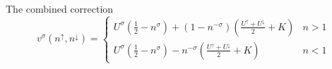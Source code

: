 \documentclass[xcolor=table,aspectratio=169]{beamer}
\numberwithin{equation}{section}
\begin{document}
\begin{frame}{The combined correction}
    \begin{equation}
        v^\sigma(n^\uparrow, n^\downarrow) =
        \begin{cases}
            {U^\sigma}
            \left(\frac{1}{2} - n^\sigma\right)
            +
            \left(
            1 - n^{-\sigma}
            \right)
            \left(
            \frac{U^\uparrow + U^\downarrow}{2}
            +K
            \right)
             & n > 1 \\
            U^\sigma
            \left(
            \frac{1}{2}
            -n^{\sigma}
            \right)
            - n^{-\sigma}
            \left(
            \frac{U^\uparrow + U^\downarrow}{2}
            + K
            \right)
             & n < 1
        \end{cases}
        \label{eqn:the_combined_potential}
    \end{equation}
\end{frame}
% 
% 
\end{document}
